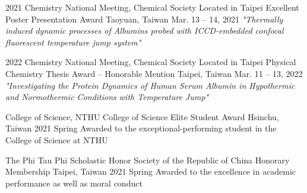


\begin{cventries}


\cventry
{2021 Chemistry National Meeting, Chemical Society Located in Taipei}
{Excellent Poster Presentation Award}
{Taoyuan, Taiwan}
{Mar. 13 -- 14, 2021}
{\textit{"Thermally induced dynamic processes of Albumins probed with ICCD-embedded confocal fluorescent temperature jump system"}}


\cventry
{2022 Chemistry National Meeting, Chemical Society Located in Taipei}
{Physical Chemistry Thesis Award -- Honorable Mention}
{Taipei, Taiwan}
{Mar. 11 -- 13, 2022}
{\textit{"Investigating the Protein Dynamics of Human Serum Albumin in Hypothermic and Normothermic Conditions with Temperature Jump"}}


\cventry
{College of Science, NTHU}
{College of Science Elite Student Award}
{Hsinchu, Taiwan}
{2021 Spring}
{Awarded to the exceptional-performing student in the College of Science at NTHU}


\cventry
{The Phi Tau Phi Scholastic Honor Society of the Republic of China}
{Honorary Membership}
{Taipei, Taiwan}
{2021 Spring}
{Awarded to the excellence in academic performance as well as moral conduct}


\end{cventries}